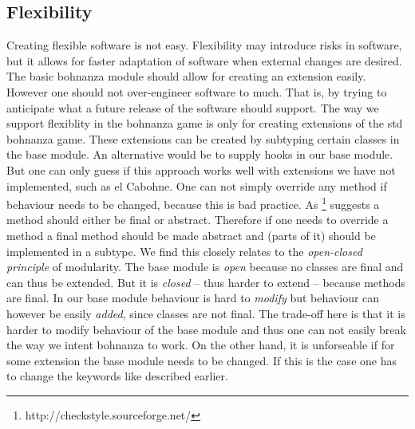 \subsection{Flexibility}
Creating flexible software is not easy. Flexibility may introduce risks in software, but it allows for faster adaptation of software when
external changes are desired. The basic bohnanza module should allow for creating an extension easily. However one should not over-engineer
software to much. That is, by trying to anticipate what a future release of the software should support. The way we support flexiblity in
the bohnanza game is only for creating extensions of the \gls{std} bohnanza game. These extensions can be created by subtyping certain
classes in the \gls{base} module. An alternative would be to supply hooks in our base module. But one can only
guess if this approach works well with extensions we have not implemented, such as el Cabohne. One can not simply override any method if
behaviour needs to be changed, because this is bad practice. As \footnote{http://checkstyle.sourceforge.net/} suggests a method
should either be final or abstract. Therefore if one needs to override a method a final method
should be made abstract and (parts of it) should be implemented in a subtype. We find this closely
relates to the \emph{open-closed principle} of modularity. The base module is \emph{open} because
no classes are final and can thus be extended. But it is \emph{closed} -- thus harder to extend --
because methods are final. In our base module behaviour is hard to \emph{modify} but behaviour can however
be easily \emph{added}, since classes are not final. The trade-off here is that it is harder to modify behaviour of the base module and thus
one can not easily break the way we intent bohnanza to work. On the other hand, it is unforseable if for some extension the base module
needs to be changed. If this is the case one has to change the keywords like described earlier.

